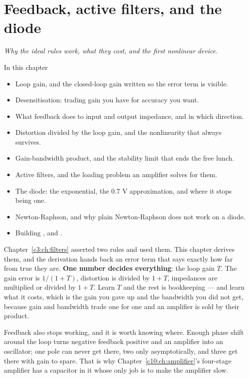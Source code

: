 
\chapter{Feedback, active filters, and the diode}
\label{c4:ch:feedback}

{\large\itshape Why the ideal rules work, what they cost, and the first nonlinear device.\par}

\begin{chapterbox}{In this chapter}
\begin{itemize}
  \item Loop gain, and the closed-loop gain written so the error term is visible.
  \item Desensitisation: trading gain you have for accuracy you want.
  \item What feedback does to input and output impedance, and in which direction.
  \item Distortion divided by the loop gain, and the nonlinearity that always survives.
  \item Gain-bandwidth product, and the stability limit that ends the free lunch.
  \item Active filters, and the loading problem an amplifier solves for them.
  \item The diode: the exponential, the 0.7 V approximation, and where it stops being one.
  \item Newton-Raphson, and why plain Newton-Raphson does not work on a diode.
  \item Building ,  and .
\end{itemize}
\end{chapterbox}

Chapter~\ref{c3:ch:filters} asserted two rules and used them. This chapter derives them, and the
derivation hands back an error term that says exactly how far from true they are.
\textbf{One number decides everything}: the loop gain $T$. The gain error is $1/(1+T)$, distortion
is divided by $1+T$, impedances are multiplied or divided by $1+T$. Learn $T$ and the rest is
bookkeeping --- and learn what it costs, which is the gain you gave up and the bandwidth you did
not get, because gain and bandwidth trade one for one and an amplifier is sold by their product.

Feedback also stops working, and it is worth knowing where. Enough phase shift around the loop
turns negative feedback positive and an amplifier into an oscillator; one pole can never get
there, two only asymptotically, and three get there with gain to spare. That is why
Chapter~\ref{c10:ch:amplifier}'s four-stage amplifier has a capacitor in it whose only job is to
make the amplifier slow.

